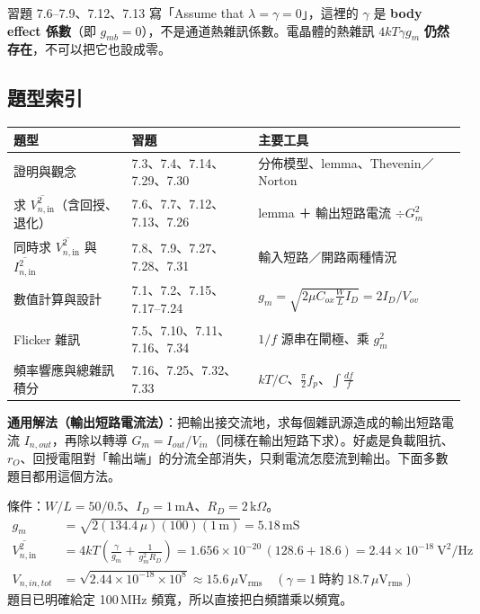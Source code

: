 \documentclass[11pt,a4paper]{article}
\newcommand{\Vsq}[1]{\overline{V^2_{n,\text{#1}}}}
\newcommand{\Isq}[1]{\overline{I^2_{n,\text{#1}}}}
\begin{document}
\begin{trapbox}[常見陷阱：習題中「$\lambda=\gamma=0$」的 $\gamma$ 是 body effect]
習題 7.6--7.9、7.12、7.13 寫「Assume that $\lambda=\gamma=0$」，這裡的 $\gamma$ 是 \textbf{body effect 係數}（即 $g_{mb}=0$），不是通道熱雜訊係數。電晶體的熱雜訊 $4kT\gamma g_m$ \textbf{仍然存在}，不可以把它也設成零。
\end{trapbox}

\subsection*{題型索引}
\begin{tabularx}{\linewidth}{>{\raggedright}p{4.2cm}>{\raggedright}p{3.6cm}X}
\toprule
題型 & 習題 & 主要工具\tabularnewline\midrule
證明與觀念 & 7.3、7.4、7.14、7.29、7.30 & 分佈模型、lemma、Thevenin／Norton\tabularnewline
求 $\Vsq{in}$（含回授、退化） & 7.6、7.7、7.12、7.13、7.26 & lemma ＋ 輸出短路電流 $\div G_m^2$\tabularnewline
同時求 $\Vsq{in}$ 與 $\Isq{in}$ & 7.8、7.9、7.27、7.28、7.31 & 輸入短路／開路兩種情況\tabularnewline
數值計算與設計 & 7.1、7.2、7.15、7.17--7.24 & $g_m=\sqrt{2\mu C_{ox}\frac WLI_D}=2I_D/V_{ov}$\tabularnewline
Flicker 雜訊 & 7.5、7.10、7.11、7.16、7.34 & $1/f$ 源串在閘極、乘 $g_m^2$\tabularnewline
頻率響應與總雜訊積分 & 7.16、7.25、7.32、7.33 & $kT/C$、$\frac{\pi}{2}f_p$、$\int\frac{df}{f}$\tabularnewline
\bottomrule
\end{tabularx}

\textbf{通用解法（輸出短路電流法）}：把輸出接交流地，求每個雜訊源造成的輸出短路電流 $I_{n,out}$，再除以轉導 $G_m=I_{out}/V_{in}$（同樣在輸出短路下求）。好處是負載阻抗、$r_O$、回授電阻對「輸出端」的分流全部消失，只剩電流怎麼流到輸出。下面多數題目都用這個方法。

條件：$W/L=50/0.5$、$I_D=1$\,mA、$R_D=2$\,k$\Omega$。
\begin{align}
g_m&=\sqrt{2(134.4\,\mu)(100)(1\,\text{m})}=5.18\,\text{mS}\\
\Vsq{in}&=4kT\left(\frac{\gamma}{g_m}+\frac{1}{g_m^2R_D}\right)=1.656\times10^{-20}\,(128.6+18.6)=2.44\times10^{-18}\ \text{V}^2/\text{Hz}\\
V_{n,in,tot}&=\sqrt{2.44\times10^{-18}\times10^8}\approx\boxed{15.6\,\mu\text{V}_{\text{rms}}}\quad(\gamma=1\ \text{時約}\ 18.7\,\mu\text{V}_{\text{rms}})
\end{align}
題目已明確給定 100\,MHz 頻寬，所以直接把白頻譜乘以頻寬。
\end{document}
